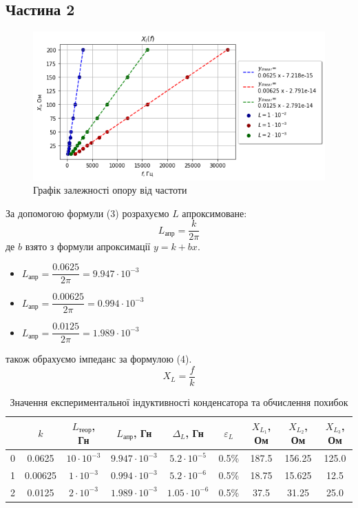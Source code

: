\documentclass[a4paper,12pt]{article}
\begin{document}
\begin{justify}
\subsection*{Частина 2} 
\begin{figure}[h!]
		\begin{center}
			\includegraphics[scale=0.8]{media/graph16}
		\end{center}
		\caption{Графік залежності опору від частоти}
		\label{Picture_1}
	\end{figure}
	За допомогою формули (3) розрахуємо $L$ апроксимоване:
	\begin{equation}
		L_{\textrm{апр}}=\dfrac{k}{2\pi}
	\end{equation}
	де $b$ взято з формули апроксимації $y=k+{b}{x}$.
	\begin{itemize}
		\item $L_{\textrm{апр}}=\dfrac{0.0625}{2\pi}=9.947\cdot10^{-3}$
		\item $L_{\textrm{апр}}=\dfrac{0.00625}{2\pi}=0.994\cdot10^{-3}$
		\item $L_{\textrm{апр}}=\dfrac{0.0125}{2\pi}=1.989\cdot10^{-3}$
	\end{itemize}
	також обрахуємо імпеданс за формулою (4).
	\begin{equation}
		X_L=\dfrac{f}{k}
	\end{equation}
\begin{table}[htp]
	\begin{flushright}
		\caption{Значення експериментальної індуктивності конденсатора та обчислення похибок }
	\end{flushright}
\begin{tabular}{|c|c|c|c|c|c|c|c|c|}
\hline
  & $k$     & $L_{\textrm{теор}}$, Гн & $L_{\textrm{апр}}$, Гн & $\Delta_L$, Гн     & $\varepsilon_L$ & $X_{L_1}$, Ом & $X_{L_2}$, Ом & $X_{L_3}$, Ом \\ \hline
0 & 0.0625  & $10\cdot10^{-3}$        & $9.947\cdot10^{-3}$    & $5.2\cdot10^{-5}$  & 0.5\%           & 187.5         & 156.25        & 125.0         \\ \hline
1 & 0.00625 & $1\cdot10^{-3}$         & $0.994\cdot10^{-3}$    & $5.2\cdot10^{-6}$  & 0.5\%           & 18.75         & 15.625        & 12.5          \\ \hline
2 & 0.0125  & $2\cdot10^{-3}$         & $1.989\cdot10^{-3}$    & $1.05\cdot10^{-6}$ & 0.5\%           & 37.5          & 31.25         & 25.0          \\ \hline
\end{tabular}
\end{table}
    

\end{justify}
\end{document}
